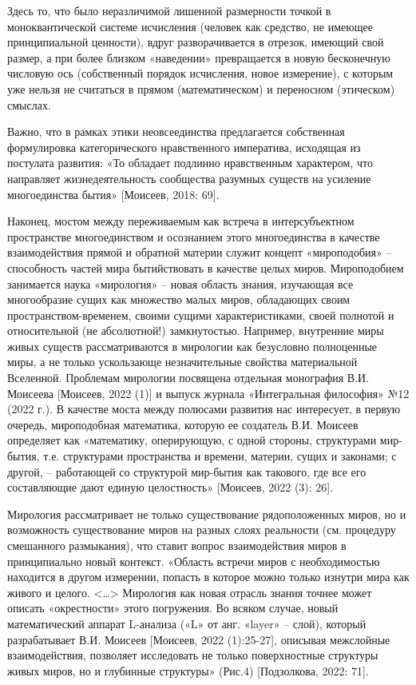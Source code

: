     Здесь то, что было неразличимой лишенной размерности точкой в моноквантической системе исчисления (человек как средство, не имеющее принципиальной ценности), вдруг разворачивается в отрезок, имеющий свой размер, а при более близком «наведении» превращается в новую бесконечную числовую ось (собственный порядок исчисления, новое измерение), с которым уже нельзя не считаться в прямом (математическом) и переносном (этическом) смыслах.

    Важно, что в рамках этики неовсеединства предлагается собственная формулировка категорического нравственного императива, исходящая из постулата развития: «То обладает подлинно нравственным характером, что направляет жизнедеятельность сообщества разумных существ на усиление многоединства бытия» [Моисеев, 2018: 69].

    Наконец, мостом между переживаемым как встреча в интерсубъектном пространстве многоединством и осознанием этого многоединства в качестве взаимодействия прямой и обратной материи служит концепт «мироподобия» – способность частей мира бытийствовать в качестве целых миров. Мироподобием занимается наука «мирология» – новая область знания, изучающая все многообразие сущих как множество малых миров, обладающих своим пространством-временем, своими сущими характеристиками, своей полнотой и относительной (не абсолютной!) замкнутостью. Например, внутренние миры живых существ рассматриваются в мирологии как безусловно полноценные миры, а не только ускользающе незначительные свойства материальной Вселенной. Проблемам мирологии посвящена отдельная монография В.И. Моисеева [Моисеев, 2022 (1)] и выпуск журнала «Интегральная философия» №12 (2022 г.). В качестве моста между полюсами развития нас интересует, в первую очередь, мироподобная математика, которую ее создатель В.И. Моисеев определяет как «математику, оперирующую, с одной стороны, структурами мир-бытия, т.е. структурами пространства и времени, материи, сущих и законами; с другой, – работающей со структурой мир-бытия как такового, где все его составляющие дают единую целостность» [Моисеев, 2022 (3): 26].

    Мирология рассматривает не только существование рядоположенных миров, но и возможность существование миров на разных слоях реальности (см. процедуру смешанного размыкания), что ставит вопрос взаимодействия миров в принципиально новый контекст. «Область встречи миров с необходимостью находится в другом измерении, попасть в которое можно только изнутри мира как живого и целого. <…> Мирология как новая отрасль знания точнее может описать «окрестности» этого погружения. Во всяком случае, новый математический аппарат L-анализа («L» от анг. «layer» – слой), который разрабатывает В.И. Моисеев [Моисеев, 2022 (1):25-27], описывая межслойные взаимодействия, позволяет исследовать не только поверхностные структуры живых миров, но и глубинные структуры» (Рис.4) [Подзолкова, 2022: 71].

